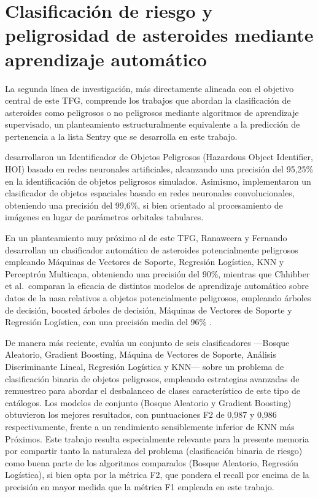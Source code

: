 \documentclass[12pt]{report} %
\begin{document}
\section{Clasificación de riesgo y peligrosidad de asteroides mediante aprendizaje automático}

La segunda línea de investigación, más directamente alineada con el objetivo central de este TFG, comprende los trabajos que abordan la clasificación de asteroides como peligrosos o no peligrosos mediante algoritmos de aprendizaje supervisado, un planteamiento estructuralmente equivalente a la predicción de pertenencia a la lista Sentry que se desarrolla en este trabajo.

\cite{hefele2020identifying} desarrollaron un Identificador de Objetos Peligrosos (Hazardous Object Identifier, HOI) basado en redes neuronales artificiales, alcanzando una precisión del 95,25\% en la identificación de objetos peligrosos simulados. Asimismo, \cite{linares2016space} implementaron un clasificador de objetos espaciales basado en redes neuronales convolucionales, obteniendo una precisión del 99,6\%, si bien orientado al procesamiento de imágenes en lugar de parámetros orbitales tabulares.

En un planteamiento muy próximo al de este TFG, Ranaweera y Fernando desarrollan un clasificador automático de asteroides potencialmente peligrosos empleando Máquinas de Vectores de Soporte, Regresión Logística, KNN y Perceptrón Multicapa, obteniendo una precisión del 90\%, mientras que Chhibber et al.\ comparan la eficacia de distintos modelos de aprendizaje automático sobre datos de la \gls{nasa} relativos a objetos potencialmente peligrosos, empleando árboles de decisión, boosted árboles de decisión, Máquinas de Vectores de Soporte y Regresión Logística, con una precisión media del 96\% \cite{mondal2025multimodel}.

De manera más reciente, \cite{chandra2025enhanced} evalúa un conjunto de seis clasificadores ---Bosque Aleatorio, Gradient Boosting, Máquina de Vectores de Soporte, Análisis Discriminante Lineal, Regresión Logística y KNN--- sobre un problema de clasificación binaria de objetos peligrosos, empleando estrategias avanzadas de remuestreo para abordar el desbalanceo de clases característico de este tipo de catálogos. Los modelos de conjunto (Bosque Aleatorio y Gradient Boosting) obtuvieron los mejores resultados, con puntuaciones F2 de 0,987 y 0,986 respectivamente, frente a un rendimiento sensiblemente inferior de KNN más Próximos. Este trabajo resulta especialmente relevante para la presente memoria por compartir tanto la naturaleza del problema (clasificación binaria de riesgo) como buena parte de los algoritmos comparados (Bosque Aleatorio, Regresión Logística), si bien opta por la métrica F2, que pondera el recall por encima de la precisión en mayor medida que la métrica F1 empleada en este trabajo.
\end{document}
